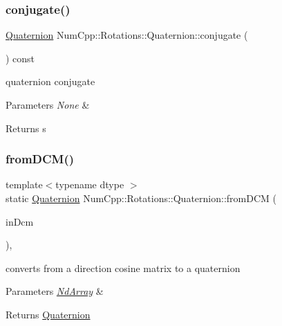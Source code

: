 \subsubsection{\texorpdfstring{conjugate()}{conjugate()}}
{\footnotesize\ttfamily \mbox{\hyperlink{class_num_cpp_1_1_rotations_1_1_quaternion}{Quaternion}} Num\+Cpp\+::\+Rotations\+::\+Quaternion\+::conjugate (\begin{DoxyParamCaption}{ }\end{DoxyParamCaption}) const\hspace{0.3cm}{\ttfamily [inline]}}

quaternion conjugate


\begin{DoxyParams}{Parameters}
{\em None} & \\
\hline
\end{DoxyParams}
\begin{DoxyReturn}{Returns}
s 
\end{DoxyReturn}
\mbox{\label{class_num_cpp_1_1_rotations_1_1_quaternion_a4589fd8623eb308578a9888cf541cc5a}} 
\subsubsection{\texorpdfstring{from\+D\+C\+M()}{fromDCM()}}
{\footnotesize\ttfamily template$<$typename dtype $>$ \\
static \mbox{\hyperlink{class_num_cpp_1_1_rotations_1_1_quaternion}{Quaternion}} Num\+Cpp\+::\+Rotations\+::\+Quaternion\+::from\+D\+CM (\begin{DoxyParamCaption}\item[{const \mbox{\hyperlink{class_num_cpp_1_1_nd_array}{Nd\+Array}}$<$ dtype $>$ \&}]{in\+Dcm }\end{DoxyParamCaption})\hspace{0.3cm}{\ttfamily [inline]}, {\ttfamily [static]}}

converts from a direction cosine matrix to a quaternion


\begin{DoxyParams}{Parameters}
{\em \mbox{\hyperlink{class_num_cpp_1_1_nd_array}{Nd\+Array}}} & \\
\hline
\end{DoxyParams}
\begin{DoxyReturn}{Returns}
\mbox{\hyperlink{class_num_cpp_1_1_rotations_1_1_quaternion}{Quaternion}} 
\end{DoxyReturn}
\mbox{\label{class_num_cpp_1_1_rotations_1_1_quaternion_aeec666c0344f72bc55aae2d10c4c5475}} 
